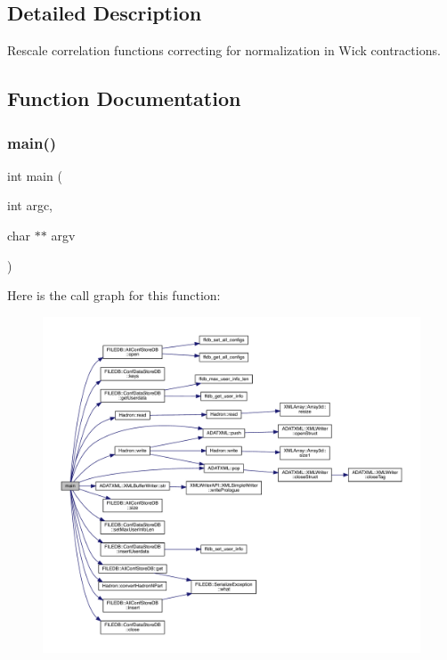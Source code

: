 \subsection{Detailed Description}
Rescale correlation functions correcting for normalization in Wick contractions. 



\subsection{Function Documentation}
\mbox{\label{adat-devel_2main_2dbutil_2dbconvert__corr__util_8cc_a3c04138a5bfe5d72780bb7e82a18e627}} 
\subsubsection{\texorpdfstring{main()}{main()}}
{\footnotesize\ttfamily int main (\begin{DoxyParamCaption}\item[{int}]{argc,  }\item[{char $\ast$$\ast$}]{argv }\end{DoxyParamCaption})}

Here is the call graph for this function\+:
\nopagebreak
\begin{figure}[H]
\begin{center}
\leavevmode
\includegraphics[width=350pt]{d5/db0/adat-devel_2main_2dbutil_2dbconvert__corr__util_8cc_a3c04138a5bfe5d72780bb7e82a18e627_cgraph}
\end{center}
\end{figure}
